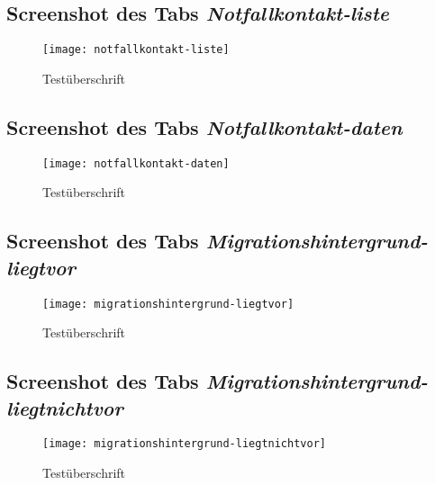 \begin{landscape}
    \subsection{Screenshot des Tabs \textit{Notfallkontakt-liste}}
    \label{section-notfallkontakt-liste}
    \begin{figure}[H]
        \centering
        \caption{Testüberschrift}
        \begin{adjustbox}{width=\linewidth, center}
            \texttt{[image: notfallkontakt-liste]}
        \end{adjustbox}
    \end{figure}

    \subsection{Screenshot des Tabs \textit{Notfallkontakt-daten}}
    \label{section-notfallkontakt-daten}
    \begin{figure}[H]
        \centering
        \caption{Testüberschrift}
        \begin{adjustbox}{width=0.6\linewidth, center}
            \texttt{[image: notfallkontakt-daten]}
        \end{adjustbox}
    \end{figure}

    \subsection{Screenshot des Tabs \textit{Migrationshintergrund-liegtvor}}
    \label{section-migrationshintergrund-liegtvor}
    \begin{figure}[H]
        \centering
        \caption{Testüberschrift}
        \begin{adjustbox}{width=\linewidth, center}
            \texttt{[image: migrationshintergrund-liegtvor]}
        \end{adjustbox}
    \end{figure}

    \subsection{Screenshot des Tabs \textit{Migrationshintergrund-liegtnichtvor}}
    \label{section-migrationshintergrund-liegtnichtvor}
    \begin{figure}[H]
        \centering
        \caption{Testüberschrift}
        \begin{adjustbox}{width=\linewidth, center}
            \texttt{[image: migrationshintergrund-liegtnichtvor]}
        \end{adjustbox}
    \end{figure}


\end{landscape}
